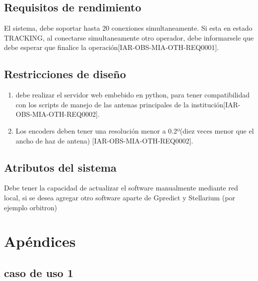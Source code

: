 \documentclass[12pt,a4paper, twosite]{article}
\begin{document}
	\subsection{Requisitos de rendimiento}
	\label{sec:org94bc543}
	
	El sistema, debe soportar hasta 20 conexiones simultaneamente. Si esta en estado TRACKING, al conectarse simultaneamente otro operador, debe informarsele que debe esperar que finalice la operación[IAR-OBS-MIA-OTH-REQ0001]. 
	
	\subsection{Restricciones de diseño}
	\label{sec:org49fe900}
	\begin{enumerate}
		
	\item debe realizar el servidor web embebido en python, para tener compatibilidad con los scripts de manejo de las antenas principales de la institución[IAR-OBS-MIA-OTH-REQ0002]. 
	\item Los encoders deben tener una resolución menor a 0.2º(diez veces menor que el ancho de haz de antena) [IAR-OBS-MIA-OTH-REQ0002]. 
	\end{enumerate}

	\subsection{Atributos del sistema}
	\label{sec:orgd0babc0}
	Debe tener la capacidad de actualizar el software manualmente mediante red local, si se desea agregar otro software aparte de Gpredict y Stellarium (por ejemplo orbitron)
	
\section{Apéndices}
\label{sec:org75cea03}
	
\subsection{caso de uso 1 }
\end{document}
